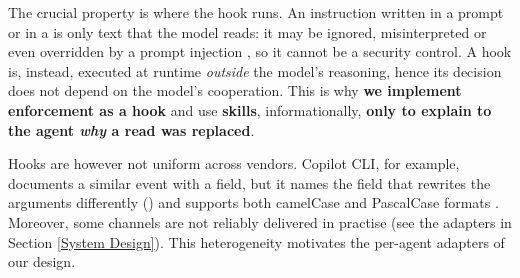 The crucial property is where the hook runs. An instruction written in a prompt or in a  is only text that the model reads: it may be ignored, misinterpreted or even overridden by a prompt injection \cite{debenedetti2025defeating}, so it cannot be a security control.
A hook is, instead, executed at runtime \textit{outside} the model's reasoning, hence its decision does not depend on the model's cooperation. This is why \textbf{we implement enforcement as a hook} and use \textbf{skills}, informationally, \textbf{only to explain to the agent \textit{why} a read was replaced}.

Hooks are however not uniform across vendors. Copilot CLI, for example, documents a similar  event with a  field, but it names the field that rewrites the arguments differently () and supports both camelCase and PascalCase formats \cite{copilothooks}.
Moreover, some channels are not reliably delivered in practise (see the adapters in Section \ref{System Design}). This heterogeneity motivates the per-agent adapters of our design.
